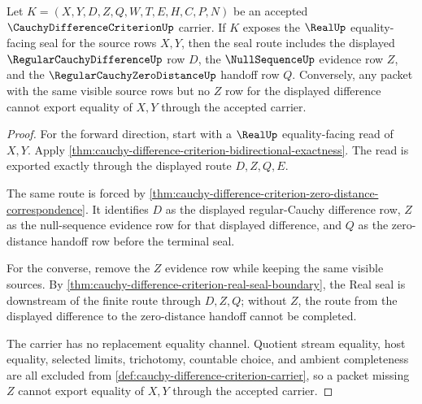 \begin{theorem}
\label{thm:cauchy-difference-criterion-null-route-converse}
Let $K=(X,Y,D,Z,Q,W,T,E,H,C,P,N)$ be an accepted $\CauchyDifferenceCriterionUp$ carrier. If $K$ exposes the $\RealUp$ equality-facing seal for the source rows $X,Y$, then the seal route includes the displayed $\RegularCauchyDifferenceUp$ row $D$, the $\NullSequenceUp$ evidence row $Z$, and the $\RegularCauchyZeroDistanceUp$ handoff row $Q$. Conversely, any packet with the same visible source rows but no $Z$ row for the displayed difference cannot export equality of $X,Y$ through the accepted carrier.
\end{theorem}
\begin{proof}
For the forward direction, start with a $\RealUp$ equality-facing read of $X,Y$. Apply \autoref{thm:cauchy-difference-criterion-bidirectional-exactness}. The read is exported exactly through the displayed route $D,Z,Q,E$.

The same route is forced by \autoref{thm:cauchy-difference-criterion-zero-distance-correspondence}. It identifies $D$ as the displayed regular-Cauchy difference row, $Z$ as the null-sequence evidence row for that displayed difference, and $Q$ as the zero-distance handoff row before the terminal seal.

For the converse, remove the $Z$ evidence row while keeping the same visible sources. By \autoref{thm:cauchy-difference-criterion-real-seal-boundary}, the Real seal is downstream of the finite route through $D,Z,Q$; without $Z$, the route from the displayed difference to the zero-distance handoff cannot be completed.

The carrier has no replacement equality channel. Quotient stream equality, host equality, selected limits, trichotomy, countable choice, and ambient completeness are all excluded from \autoref{def:cauchy-difference-criterion-carrier}, so a packet missing $Z$ cannot export equality of $X,Y$ through the accepted carrier.
\end{proof}

